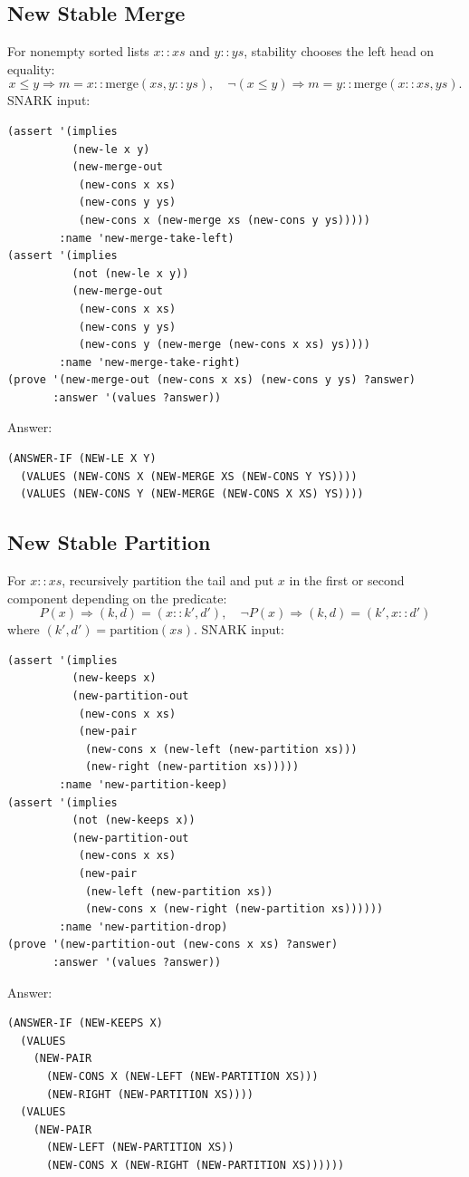 \documentclass[runningheads]{llncs}
\begin{document}
\subsection{New Stable Merge}

For nonempty sorted lists \(x::xs\) and \(y::ys\), stability chooses the left
head on equality:
\[
  x\leq y \Rightarrow m=x::\mathrm{merge}(xs,y::ys),\quad
  \neg(x\leq y) \Rightarrow m=y::\mathrm{merge}(x::xs,ys).
\]
SNARK input:
\begin{lstlisting}
(assert '(implies
          (new-le x y)
          (new-merge-out
           (new-cons x xs)
           (new-cons y ys)
           (new-cons x (new-merge xs (new-cons y ys)))))
        :name 'new-merge-take-left)
(assert '(implies
          (not (new-le x y))
          (new-merge-out
           (new-cons x xs)
           (new-cons y ys)
           (new-cons y (new-merge (new-cons x xs) ys))))
        :name 'new-merge-take-right)
(prove '(new-merge-out (new-cons x xs) (new-cons y ys) ?answer)
       :answer '(values ?answer))
\end{lstlisting}
Answer:
\begin{lstlisting}
(ANSWER-IF (NEW-LE X Y)
  (VALUES (NEW-CONS X (NEW-MERGE XS (NEW-CONS Y YS))))
  (VALUES (NEW-CONS Y (NEW-MERGE (NEW-CONS X XS) YS))))
\end{lstlisting}

\subsection{New Stable Partition}

For \(x::xs\), recursively partition the tail and put \(x\) in the first or
second component depending on the predicate:
\[
  P(x) \Rightarrow (k,d)=(x::k',d'),\quad
  \neg P(x) \Rightarrow (k,d)=(k',x::d')
\]
where \((k',d')=\mathrm{partition}(xs)\).  SNARK input:
\begin{lstlisting}
(assert '(implies
          (new-keeps x)
          (new-partition-out
           (new-cons x xs)
           (new-pair
            (new-cons x (new-left (new-partition xs)))
            (new-right (new-partition xs)))))
        :name 'new-partition-keep)
(assert '(implies
          (not (new-keeps x))
          (new-partition-out
           (new-cons x xs)
           (new-pair
            (new-left (new-partition xs))
            (new-cons x (new-right (new-partition xs))))))
        :name 'new-partition-drop)
(prove '(new-partition-out (new-cons x xs) ?answer)
       :answer '(values ?answer))
\end{lstlisting}
Answer:
\begin{lstlisting}
(ANSWER-IF (NEW-KEEPS X)
  (VALUES
    (NEW-PAIR
      (NEW-CONS X (NEW-LEFT (NEW-PARTITION XS)))
      (NEW-RIGHT (NEW-PARTITION XS))))
  (VALUES
    (NEW-PAIR
      (NEW-LEFT (NEW-PARTITION XS))
      (NEW-CONS X (NEW-RIGHT (NEW-PARTITION XS))))))
\end{lstlisting}
\end{document}
